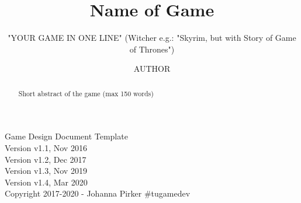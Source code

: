 \documentclass[a4paper]{scrreprt}
\title{Name of Game}
\subtitle{"YOUR GAME IN ONE LINE" (Witcher e.g.: "Skyrim, but with Story of Game of Thrones")}
\author{AUTHOR}
\begin{document}
\maketitle

\null\vfill
\noindent
Game Design Document Template\\ 
Version v1.1, Nov 2016\\
Version v1.2, Dec 2017\\
Version v1.3, Nov 2019\\
Version v1.4, Mar 2020\\
Copyright 2017-2020 - Johanna Pirker \#tugamedev\\
\newpage

\begin{abstract}
Short abstract of the game (max 150 words) 
\end{abstract}

\tableofcontents













%
%
\end{document}
